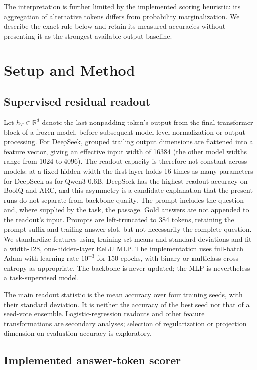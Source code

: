 The interpretation is further limited by the implemented scoring heuristic:
its aggregation of alternative tokens differs from probability
marginalization. We describe the exact rule below and retain its measured
accuracies without presenting it as the strongest available output baseline.

\section{Setup and Method}
\label{sec:setup}

\subsection{Supervised residual readout}

Let $h_T\in\mathbb{R}^d$ denote the last nonpadding token's output from
the final transformer block of a frozen model, before subsequent model-level
normalization or output processing. For DeepSeek, grouped trailing output
dimensions are flattened into a feature vector, giving an effective input
width of 16384 (the other model widths range from 1024 to 4096). The readout
capacity is therefore not constant across models: at a fixed hidden width the
first layer holds 16 times as many parameters for DeepSeek as for
Qwen3-0.6B. DeepSeek has the highest readout accuracy on BoolQ and ARC, and
this asymmetry is a candidate explanation that the present runs do not
separate from backbone quality. The prompt includes the
question and, where supplied by the task, the passage. Gold answers are not
appended to the readout's input. Prompts are left-truncated to 384 tokens,
retaining the prompt suffix and trailing answer slot, but not necessarily
the complete question. We standardize features using training-set means and standard
deviations and fit a width-128, one-hidden-layer ReLU MLP. The implementation
uses full-batch Adam with learning rate $10^{-3}$ for 150 epochs, with binary
or multiclass cross-entropy as appropriate. The backbone is never updated;
the MLP is nevertheless a task-supervised model.

The main readout statistic is the mean accuracy over four training seeds,
with their standard deviation. It is neither the accuracy of the best seed
nor that of a seed-vote ensemble. Logistic-regression readouts and other
feature transformations are secondary analyses; selection of regularization
or projection dimension on evaluation accuracy is exploratory.

\subsection{Implemented answer-token scorer}
\label{sec:scorer}

